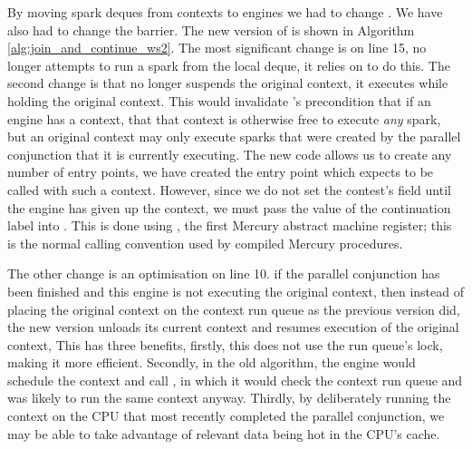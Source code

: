 By moving spark deques from contexts to engines we had to change \idle.
We have also had to change the \joinandcontinue barrier.
The new version of \joinandcontinue is shown in Algorithm
\ref{alg:join_and_continue_ws2}.
The most significant change is on line 15,
\joinandcontinue no longer attempts to run a spark from the local deque,
it relies on \idle to do this.
The second change is that \joinandcontinue no longer suspends the original
context, it executes \idle while holding the original context.
This would invalidate \idle's precondition that if an engine has a context,
that that context is otherwise free to execute \emph{any} spark,
but an original context may only execute sparks that were created by the
parallel conjunction that it is currently executing.
The new \idle code allows us to create any number of entry points,
we have created the \idleorigcontext entry point which expects to be called
with such a context.
However, since we do not set the contest's  field until
the engine has given up the context,
we must pass the value of the continuation label into \idleorigcontext.
This is done using , the first Mercury abstract machine
register;
this is the normal calling convention used by compiled Mercury procedures.

The other change is an optimisation on line 10.
if the parallel conjunction has been finished and this engine is not
executing the original context,
then instead of placing the original context on the context run queue as the
previous version did,
the new version unloads its current context and resumes execution of the
original context,
This has three benefits,
firstly, this does not use the run queue's lock,
making it more efficient.
Secondly, in the old algorithm, the engine would schedule the context and
call \idle,
in which it would check the context run queue and was likely to run the same
context anyway.
Thirdly, by deliberately running the context on the CPU that most
recently completed the parallel conjunction,
we may be able to take advantage of relevant data being hot in the CPU's
cache.


